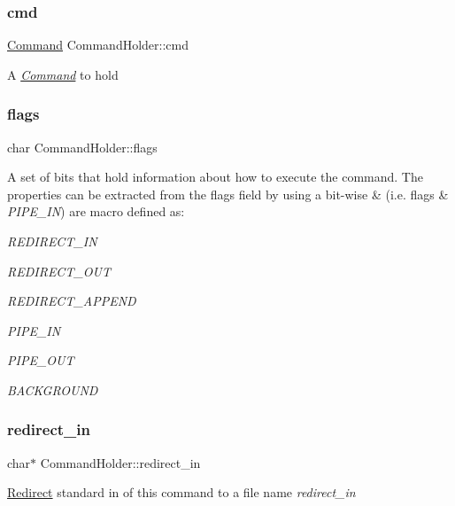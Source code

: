 \subsubsection{\texorpdfstring{cmd}{cmd}}
{\footnotesize\ttfamily \hyperlink{unionCommand}{Command} Command\+Holder\+::cmd}

A {\itshape \hyperlink{unionCommand}{Command}} to hold \mbox{\label{structCommandHolder_acb381d6ab29bc574dc1ff452adc7847a}} 
\subsubsection{\texorpdfstring{flags}{flags}}
{\footnotesize\ttfamily char Command\+Holder\+::flags}

A set of bits that hold information about how to execute the command. The properties can be extracted from the flags field by using a bit-\/wise \& (i.\+e. flags \& {\itshape P\+I\+P\+E\+\_\+\+IN}) are macro defined as\+:
\begin{DoxyItemize}
\item {\itshape R\+E\+D\+I\+R\+E\+C\+T\+\_\+\+IN} 
\item {\itshape R\+E\+D\+I\+R\+E\+C\+T\+\_\+\+O\+UT} 
\item {\itshape R\+E\+D\+I\+R\+E\+C\+T\+\_\+\+A\+P\+P\+E\+ND} 
\item {\itshape P\+I\+P\+E\+\_\+\+IN} 
\item {\itshape P\+I\+P\+E\+\_\+\+O\+UT} 
\item {\itshape B\+A\+C\+K\+G\+R\+O\+U\+ND} 
\end{DoxyItemize}\mbox{\label{structCommandHolder_a3691bd22096644e8c6be327fc7d0d246}} 
\subsubsection{\texorpdfstring{redirect\+\_\+in}{redirect\_in}}
{\footnotesize\ttfamily char$\ast$ Command\+Holder\+::redirect\+\_\+in}

\hyperlink{structRedirect}{Redirect} standard in of this command to a file name {\itshape redirect\+\_\+in} \mbox{\label{structCommandHolder_ac7bfc3e78a8e8b511e2b324c45a17d6f}} 
